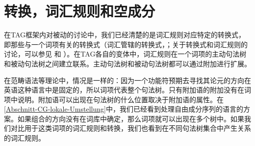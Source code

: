 \section{转换，词汇规则和空成分}
\label{Abschnitt-leere-Elemente-LRs-Transformations}

在TAG框架内对被动的讨论中，我们已经清楚的是词汇规则对应特定的转换式，即那些与一个词项有关的转换式（词汇管辖的转换式，\citealp{Dowty78a}；关于转换式和词汇规则的讨论，可以参见 和 ）。在TAG\indextagc 各自的变体中，词汇规则在一个词项的主动句法树和被动句法树之间建立联系。主动句法树和被动句法树都可以通过附加进行扩展。

在范畴语法\indexcgc 等理论中，情况是一样的：因为一个功能符预期去寻找其论元的方向在英语这种语言中是固定的，所以词项代表整个句法树。只有附加语的附加没有在词项中说明。附加语可以出现在句法树的什么位置取决于附加语的属性。在\ref{Abschnitt-CG-lokale-Umstellung}中，我们已经看到处理自由成分序列的语言的方案。如果组合的方向没有在词库中确定，那么词项就可以出现在多个树中。如果我们对比用于这类词项的词汇规则和转换，我们也看到在不同句法树集合中产生关系的词汇规则。

